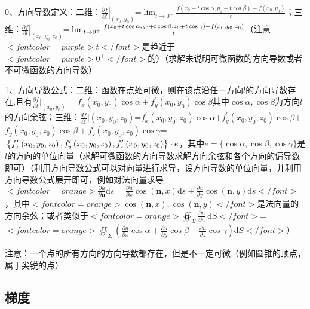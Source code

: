 0、方向导数定义：二维：$ \left.\frac{\partial f}{\partial l}\right|_{\left(x_{0}, y_{0}\right)} $=$ \lim _{t \rightarrow 0^{+}} \frac{f\left(x_{0}+t \cos \alpha, y_{0}+t \cos \beta\right)-f\left(x_{0}, y_{0}\right)}{t} $；三维：$ \left.\frac{\partial f}{\partial l}\right|_{\left(x_{0}, y_{0}, z_{0}\right)} $=$ \newline\lim _{t \rightarrow 0^{+}} \frac{f\left(x_{0}+t \cos \alpha, y_{0}+t \cos \beta, z_{0}+t \cos \gamma\right)-f\left(x_{0}, y_{0}, z_{0}\right)}{t} $（注意$ <font color=purple>t</font> $是趋近于$ <font color=purple>0^+</font> $的）（求解未说明可微函数的方向导数或者不可微函数的方向导数）

1、方向导数公式：二维：函数在点处可微，则在该点沿任一方向$ l $的方向导数存在,且有$ \frac{\partial f}{\partial l}|_{\left(x_{0}, y_{0}\right)}= f_{x}^{\prime}(x_{0},y_{0}) \cos \alpha+f_{y}^{\prime}\left(x_{0}, y_{0}\right) \cos \beta $其中$ \cos \alpha, \cos \beta $为方向$ l $的方向余弦；三维：$ \frac{d f}{\partial l}|{\left(x_{0}, y_{0}, z_{0}\right)}  $=$ f_{x}^{\prime}\left(x_{0}, y_{0}, z_{0}\right) \cos \alpha $+$ f_{y}^{\prime}\left(x_{0}, y_{0}, z_{0}\right) \cos \beta $+$ f_{y}^{\prime}\left(x_{0}, y_{0}, z_{0}\right) \cos \beta+f_{z}^{\prime}\left(x_{0}, y_{0}, z_{0}\right) \cos \gamma $=$ \newline\left\{f_{x}^{\prime}\left(x_{0}, y_{0}, z_{0}\right), f_{y}^{\prime}\left(x_{0}, y_{0}, z_{0}\right), f_{z}^{\prime}\left(x_{0}, y_{0}, z_{0}\right)\right\} \cdot e $，其中$ e=\{\cos \alpha, \cos \beta, \cos \gamma\} $是$ l $的方向的单位向量（求解可微函数的方向导数求解方向余弦和各个方向的偏导数即可）（利用方向导数公式可以对向量进行求导，设方向导数的单位向量，并利用方向导数公式展开即可，例如对法向量求导$ <font color=orange>\frac{\partial u}{\partial \boldsymbol{n}} \mathrm{d} s=\frac{\partial u}{\partial x} \cos (\boldsymbol{n}, x) \mathrm{d} s+\frac{\partial u}{\partial y} \cos (\boldsymbol{n}, y) \mathrm{d} s</font> $，其中$ <font color=orange>\cos (\boldsymbol{n}, x) ,\cos (\boldsymbol{n}, y)</font> $是法向量的方向余弦；或者类似于$ <font color=orange>\oiint_{\Sigma} \frac{\partial u}{\partial n} \mathrm{~d} S</font> $=$ <font color=orange>\oiint_{\Sigma}(\frac{\partial u}{\partial x} \cos \alpha+\frac{\partial u}{\partial y} \cos \beta+\frac{\partial u}{\partial z} \cos \gamma) \mathrm{d} S</font> $）

注意：一个点的所有方向的方向导数都存在，但是不一定可微（例如圆锥的顶点，属于尖锐的点）



\subsection{梯度}

